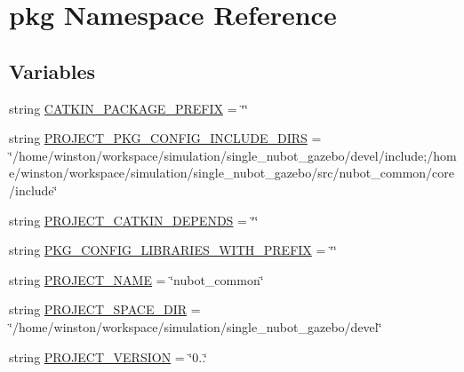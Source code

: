 \hypertarget{namespacepkg}{\section{pkg Namespace Reference}
\label{namespacepkg}
}
\subsection*{Variables}
\begin{DoxyCompactItemize}
\item 
string \hyperlink{namespacepkg_ae26c7a5a06b7d738f4d210ca449e6bee}{C\-A\-T\-K\-I\-N\-\_\-\-P\-A\-C\-K\-A\-G\-E\-\_\-\-P\-R\-E\-F\-I\-X} = \char`\"{}\char`\"{}
\item 
string \hyperlink{namespacepkg_a2760bf8266ff58da440f65ee91b203ab}{P\-R\-O\-J\-E\-C\-T\-\_\-\-P\-K\-G\-\_\-\-C\-O\-N\-F\-I\-G\-\_\-\-I\-N\-C\-L\-U\-D\-E\-\_\-\-D\-I\-R\-S} = \char`\"{}/home/winston/workspace/simulation/single\-\_\-nubot\-\_\-gazebo/devel/include;/home/winston/workspace/simulation/single\-\_\-nubot\-\_\-gazebo/src/nubot\-\_\-common/core/include\char`\"{}
\item 
string \hyperlink{namespacepkg_a17c18447fad253ee1c0d76deec88028c}{P\-R\-O\-J\-E\-C\-T\-\_\-\-C\-A\-T\-K\-I\-N\-\_\-\-D\-E\-P\-E\-N\-D\-S} = \char`\"{}\char`\"{}
\item 
string \hyperlink{namespacepkg_a433e30cecb4a0123a7c4b384d168e336}{P\-K\-G\-\_\-\-C\-O\-N\-F\-I\-G\-\_\-\-L\-I\-B\-R\-A\-R\-I\-E\-S\-\_\-\-W\-I\-T\-H\-\_\-\-P\-R\-E\-F\-I\-X} = \char`\"{}\char`\"{}
\item 
string \hyperlink{namespacepkg_a7dfbe99257c26f5e4a3a5483995d9ddc}{P\-R\-O\-J\-E\-C\-T\-\_\-\-N\-A\-M\-E} = \char`\"{}nubot\-\_\-common\char`\"{}
\item 
string \hyperlink{namespacepkg_a3f0f1b4bc03c596525e025539ca4332f}{P\-R\-O\-J\-E\-C\-T\-\_\-\-S\-P\-A\-C\-E\-\_\-\-D\-I\-R} = \char`\"{}/home/winston/workspace/simulation/single\-\_\-nubot\-\_\-gazebo/devel\char`\"{}
\item 
string \hyperlink{namespacepkg_ab1037914b9286bb61855131c06149648}{P\-R\-O\-J\-E\-C\-T\-\_\-\-V\-E\-R\-S\-I\-O\-N} = \char`\"{}0..\char`\"{}
\end{DoxyCompactItemize}


